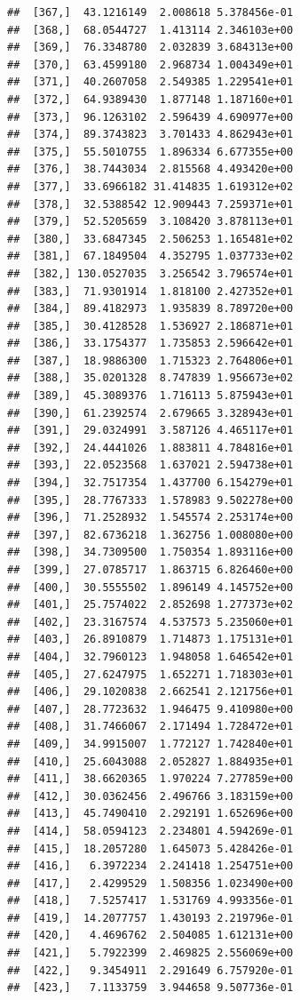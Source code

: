 \documentclass[article]{jss}\usepackage[]{graphicx}\usepackage[]{xcolor}
\makeatletter
\newenvironment{kframe}{%
 \def\at@end@of@kframe{}%
 \ifinner\ifhmode%
  \def\at@end@of@kframe{\end{minipage}}%
  \begin{minipage}{\columnwidth}%
 \fi\fi%
 \def\FrameCommand##1{\hskip\@totalleftmargin \hskip-\fboxsep
 \colorbox{shadecolor}{##1}\hskip-\fboxsep
     \hskip-\linewidth \hskip-\@totalleftmargin \hskip\columnwidth}%
 \MakeFramed {\advance\hsize-\width
   \@totalleftmargin\z@ \linewidth\hsize
   \@setminipage}}%
 {\par\unskip\endMakeFramed%
 \at@end@of@kframe}
\newenvironment{knitrout}{}{} %
\makeatother
\begin{document}
\begin{knitrout}
\begin{kframe}
\begin{verbatim}
##  [367,]  43.1216149  2.008618 5.378456e-01
##  [368,]  68.0544727  1.413114 2.346103e+00
##  [369,]  76.3348780  2.032839 3.684313e+00
##  [370,]  63.4599180  2.968734 1.004349e+01
##  [371,]  40.2607058  2.549385 1.229541e+01
##  [372,]  64.9389430  1.877148 1.187160e+01
##  [373,]  96.1263102  2.596439 4.690977e+00
##  [374,]  89.3743823  3.701433 4.862943e+01
##  [375,]  55.5010755  1.896334 6.677355e+00
##  [376,]  38.7443034  2.815568 4.493420e+00
##  [377,]  33.6966182 31.414835 1.619312e+02
##  [378,]  32.5388542 12.909443 7.259371e+01
##  [379,]  52.5205659  3.108420 3.878113e+01
##  [380,]  33.6847345  2.506253 1.165481e+02
##  [381,]  67.1849504  4.352795 1.037733e+02
##  [382,] 130.0527035  3.256542 3.796574e+01
##  [383,]  71.9301914  1.818100 2.427352e+01
##  [384,]  89.4182973  1.935839 8.789720e+00
##  [385,]  30.4128528  1.536927 2.186871e+01
##  [386,]  33.1754377  1.735853 2.596642e+01
##  [387,]  18.9886300  1.715323 2.764806e+01
##  [388,]  35.0201328  8.747839 1.956673e+02
##  [389,]  45.3089376  1.716113 5.875943e+01
##  [390,]  61.2392574  2.679665 3.328943e+01
##  [391,]  29.0324991  3.587126 4.465117e+01
##  [392,]  24.4441026  1.883811 4.784816e+01
##  [393,]  22.0523568  1.637021 2.594738e+01
##  [394,]  32.7517354  1.437700 6.154279e+01
##  [395,]  28.7767333  1.578983 9.502278e+00
##  [396,]  71.2528932  1.545574 2.253174e+00
##  [397,]  82.6736218  1.362756 1.008080e+00
##  [398,]  34.7309500  1.750354 1.893116e+00
##  [399,]  27.0785717  1.863715 6.826460e+00
##  [400,]  30.5555502  1.896149 4.145752e+00
##  [401,]  25.7574022  2.852698 1.277373e+02
##  [402,]  23.3167574  4.537573 5.235060e+01
##  [403,]  26.8910879  1.714873 1.175131e+01
##  [404,]  32.7960123  1.948058 1.646542e+01
##  [405,]  27.6247975  1.652271 1.718303e+01
##  [406,]  29.1020838  2.662541 2.121756e+01
##  [407,]  28.7723632  1.946475 9.410980e+00
##  [408,]  31.7466067  2.171494 1.728472e+01
##  [409,]  34.9915007  1.772127 1.742840e+01
##  [410,]  25.6043088  2.052827 1.884935e+01
##  [411,]  38.6620365  1.970224 7.277859e+00
##  [412,]  30.0362456  2.496766 3.183159e+00
##  [413,]  45.7490410  2.292191 1.652696e+00
##  [414,]  58.0594123  2.234801 4.594269e-01
##  [415,]  18.2057280  1.645073 5.428426e-01
##  [416,]   6.3972234  2.241418 1.254751e+00
##  [417,]   2.4299529  1.508356 1.023490e+00
##  [418,]   7.5257417  1.531769 4.993356e-01
##  [419,]  14.2077757  1.430193 2.219796e-01
##  [420,]   4.4696762  2.504085 1.612131e+00
##  [421,]   5.7922399  2.469825 2.556069e+00
##  [422,]   9.3454911  2.291649 6.757920e-01
##  [423,]   7.1133759  3.944658 9.507736e-01

\end{verbatim}
\end{kframe}
\end{knitrout}
\end{document}
